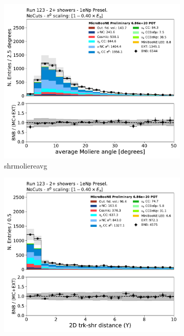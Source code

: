 \begin{figure}[H]
    \centering
    \begin{subfigure}{0.3\textwidth}
    \includegraphics[width=1.0\textwidth]{Sidebands/Figures/1eNp/TwoShower/TwoPShr_NP_None_pi0e040/shrmoliereavg.pdf}
    \caption{shrmoliereavg}
    \end{subfigure}
    \begin{subfigure}{0.3\textwidth}
    \includegraphics[width=1.0\textwidth]{Sidebands/Figures/1eNp/TwoShower/TwoPShr_NP_None_pi0e040/trkshrhitdist2.pdf}

\end{subfigure}
\end{figure}
